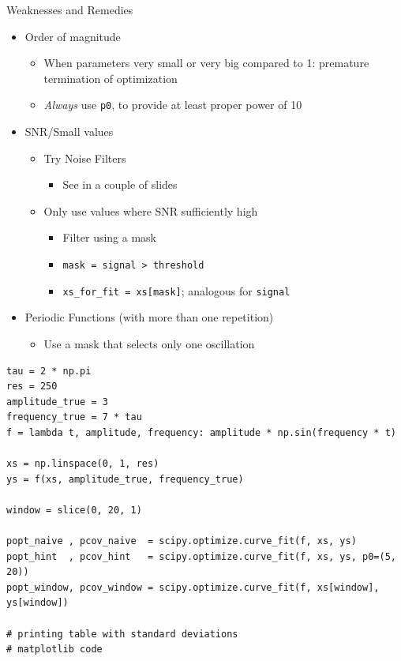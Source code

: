 \begin{frame}{Weaknesses and Remedies}
%
\begin{itemize}
\item Order of magnitude
	\begin{itemize}
	\item When parameters very small or very big compared to 1: premature termination of optimization
	\item[\Thus] \emph{Always} use \texttt{p0}, to provide at least proper power of 10
	\end{itemize}
\item SNR/Small values
	\begin{itemize}
	\item[\Thus] Try Noise Filters
		\begin{itemize}
		\item See in a couple of slides
		\end{itemize}
	\item[\Thus] Only use values where SNR sufficiently high
		\begin{itemize}
		\item Filter using a mask
		\item \texttt{mask = signal > threshold}
		\item \texttt{xs\_for\_fit = xs[mask]}; analogous for \texttt{signal}
		\end{itemize}
	\end{itemize}
\item Periodic Functions (with more than one repetition)
	\begin{itemize}
	\item[\Thus] Use a mask that selects only one oscillation
	\end{itemize}
\end{itemize}
%
\end{frame}


\begin{frame}[fragile]
%
\begin{codebox}
\begin{verbatim}
tau = 2 * np.pi
res = 250
amplitude_true = 3
frequency_true = 7 * tau
f = lambda t, amplitude, frequency: amplitude * np.sin(frequency * t)

xs = np.linspace(0, 1, res)
ys = f(xs, amplitude_true, frequency_true)

window = slice(0, 20, 1)

popt_naive , pcov_naive  = scipy.optimize.curve_fit(f, xs, ys)
popt_hint  , pcov_hint   = scipy.optimize.curve_fit(f, xs, ys, p0=(5, 20))
popt_window, pcov_window = scipy.optimize.curve_fit(f, xs[window], ys[window])

# printing table with standard deviations
# matplotlib code
\end{verbatim}
\end{codebox}
%
\end{frame}

